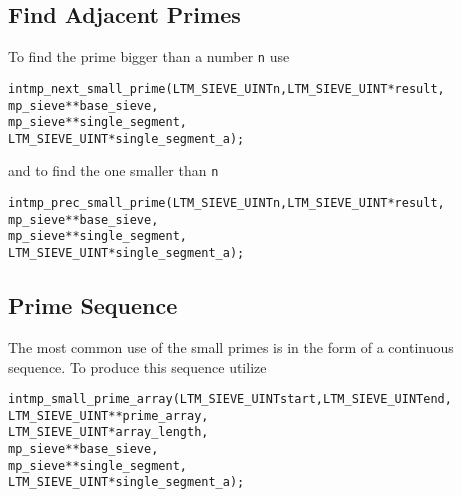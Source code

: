 \documentclass[synpaper]{book}
\begin{document}
\subsection{Find Adjacent Primes}
To find the prime bigger than a number \texttt{n} use
\begin{alltt}
int mp_next_small_prime(LTM_SIEVE_UINT n, LTM_SIEVE_UINT *result,
                        mp_sieve **base_sieve,
                        mp_sieve **single_segment,
                        LTM_SIEVE_UINT *single_segment_a);
\end{alltt}
and to find the one smaller than \texttt{n}
\begin{alltt}
int mp_prec_small_prime(LTM_SIEVE_UINT n, LTM_SIEVE_UINT *result,
                        mp_sieve **base_sieve,
                        mp_sieve **single_segment,
                        LTM_SIEVE_UINT *single_segment_a);
\end{alltt}
\subsection{Prime Sequence}
The most common use of the small primes is in the form of a continuous sequence. To produce this sequence utilize
\begin{alltt}
int mp_small_prime_array(LTM_SIEVE_UINT start, LTM_SIEVE_UINT end,
                         LTM_SIEVE_UINT **prime_array,
                         LTM_SIEVE_UINT *array_length,
                         mp_sieve **base_sieve,
                         mp_sieve **single_segment,
                         LTM_SIEVE_UINT *single_segment_a);
\end{alltt}
\end{document}
